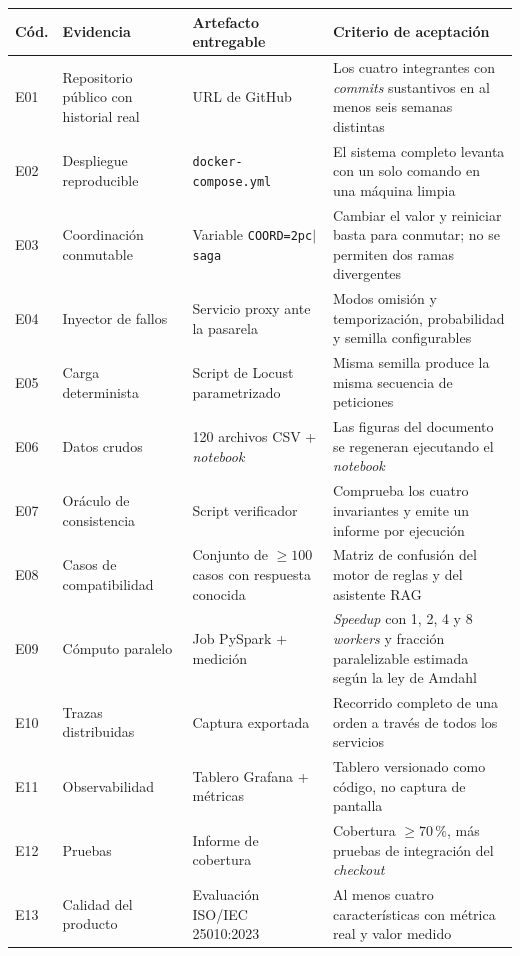 \documentclass[11pt,a4paper]{article}
\begin{document}
\begin{center}
	\footnotesize
	\begin{longtable}{@{}p{0.9cm}p{4.6cm}p{4.2cm}p{5.0cm}@{}}
		\toprule
		\textbf{Cód.} & \textbf{Evidencia} & \textbf{Artefacto entregable} & \textbf{Criterio de aceptación} \\
		\midrule
		\endhead
		E01 & Repositorio público con historial real & URL de GitHub & Los cuatro integrantes con \emph{commits} sustantivos en al menos seis semanas distintas \\
		E02 & Despliegue reproducible & \texttt{docker-compose.yml} & El sistema completo levanta con un solo comando en una máquina limpia \\
		E03 & Coordinación conmutable & Variable \texttt{COORD=2pc$\mid$saga} & Cambiar el valor y reiniciar basta para conmutar; no se permiten dos ramas divergentes \\
		E04 & Inyector de fallos & Servicio proxy ante la pasarela & Modos omisión y temporización, probabilidad y semilla configurables \\
		E05 & Carga determinista & Script de Locust parametrizado & Misma semilla produce la misma secuencia de peticiones \\
		E06 & Datos crudos & 120 archivos CSV + \emph{notebook} & Las figuras del documento se regeneran ejecutando el \emph{notebook} \\
		E07 & Oráculo de consistencia & Script verificador & Comprueba los cuatro invariantes y emite un informe por ejecución \\
		E08 & Casos de compatibilidad & Conjunto de $\geq 100$ casos con respuesta conocida & Matriz de confusión del motor de reglas y del asistente RAG \\
		E09 & Cómputo paralelo & Job PySpark + medición & \emph{Speedup} con 1, 2, 4 y 8 \emph{workers} y fracción paralelizable estimada según la ley de Amdahl \\
		E10 & Trazas distribuidas & Captura exportada & Recorrido completo de una orden a través de todos los servicios \\
		E11 & Observabilidad & Tablero Grafana + métricas & Tablero versionado como código, no captura de pantalla \\
		E12 & Pruebas & Informe de cobertura & Cobertura $\geq 70\,\%$, más pruebas de integración del \emph{checkout} \\
		E13 & Calidad del producto & Evaluación ISO/IEC 25010:2023 & Al menos cuatro características con métrica real y valor medido \cite{iso25010_2023} \\

\end{longtable}
\end{center}
\end{document}
